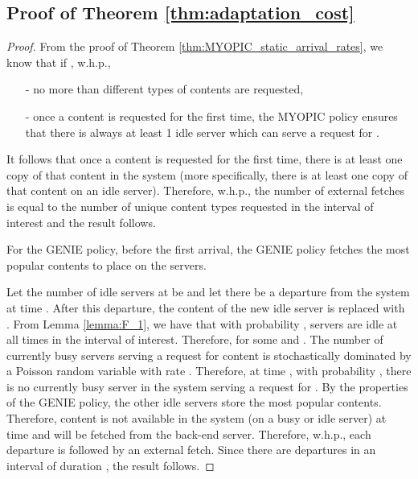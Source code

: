 \documentclass[10pt, conference, letterpaper]{IEEEtran}
\begin{document}
\subsection{Proof of Theorem \ref{thm:adaptation_cost}}
\begin{proof}
	From the proof of Theorem \ref{thm:MYOPIC_static_arrival_rates}, we know that if , w.h.p.,
	\begin{itemize}
		\item[-] no more than  different types of contents are requested,
		\item[-] once a content  is requested for the first time, the MYOPIC policy ensures that there is always at least 1 idle server which can serve a request for .
	\end{itemize}
	
	It follows that once a content is requested for the first time, there is at least one copy of that content in the system (more specifically, there is at least one copy of that content on an idle server). Therefore, w.h.p., the number of external fetches is equal to the number of unique content types requested in the interval of interest and the result follows.
	
	For the GENIE policy, before the first arrival, the GENIE policy fetches the  most popular contents to place on the servers.
	
	Let the number of idle servers at  be  and let there be a departure from the system at time . After this departure, the content of the new idle server is replaced with . From Lemma \ref{lemma:F_1}, we have that with probability ,  servers are idle at all times in the interval of interest. Therefore,  for some  and . The number of currently busy servers serving a request for content  is stochastically dominated by a Poisson random variable with rate . Therefore, at time , with probability , there is no currently busy server in the system serving a request for . By the properties of the GENIE policy, the other  idle servers store the  most popular contents. Therefore, content  is not available in the system (on a busy or idle server) at time  and will be fetched from the back-end server. Therefore, w.h.p., each departure is followed by an external fetch. Since there are  departures in an interval of duration , the result follows.
	
\end{proof}
\end{document}
